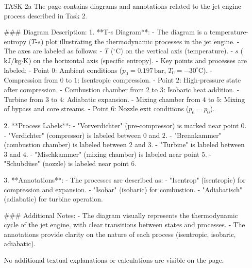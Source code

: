 TASK 2a  
The page contains diagrams and annotations related to the jet engine process described in Task 2.  

### Diagram Description:  
1. **T-s Diagram**:  
   - The diagram is a temperature-entropy (\( T \)-\( s \)) plot illustrating the thermodynamic processes in the jet engine.  
   - The axes are labeled as follows:  
     - \( T \) (\( ^\circ \text{C} \)) on the vertical axis (temperature).  
     - \( s \) (\( \text{kJ/kg·K} \)) on the horizontal axis (specific entropy).  
   - Key points and processes are labeled:  
     - Point \( 0 \): Ambient conditions (\( p_0 = 0.197 \, \text{bar} \), \( T_0 = -30^\circ \text{C} \)).  
     - Compression from \( 0 \) to \( 1 \): Isentropic compression.  
     - Point \( 2 \): High-pressure state after compression.  
     - Combustion chamber from \( 2 \) to \( 3 \): Isobaric heat addition.  
     - Turbine from \( 3 \) to \( 4 \): Adiabatic expansion.  
     - Mixing chamber from \( 4 \) to \( 5 \): Mixing of bypass and core streams.  
     - Point \( 6 \): Nozzle exit conditions (\( p_6 = p_0 \)).  

2. **Process Labels**:  
   - "Vorverdichter" (pre-compressor) is marked near point \( 0 \).  
   - "Verdichter" (compressor) is labeled between \( 0 \) and \( 2 \).  
   - "Brennkammer" (combustion chamber) is labeled between \( 2 \) and \( 3 \).  
   - "Turbine" is labeled between \( 3 \) and \( 4 \).  
   - "Mischkammer" (mixing chamber) is labeled near point \( 5 \).  
   - "Schubdüse" (nozzle) is labeled near point \( 6 \).  

3. **Annotations**:  
   - The processes are described as:  
     - "Isentrop" (isentropic) for compression and expansion.  
     - "Isobar" (isobaric) for combustion.  
     - "Adiabatisch" (adiabatic) for turbine operation.  

### Additional Notes:  
- The diagram visually represents the thermodynamic cycle of the jet engine, with clear transitions between states and processes.  
- The annotations provide clarity on the nature of each process (isentropic, isobaric, adiabatic).  

No additional textual explanations or calculations are visible on the page.